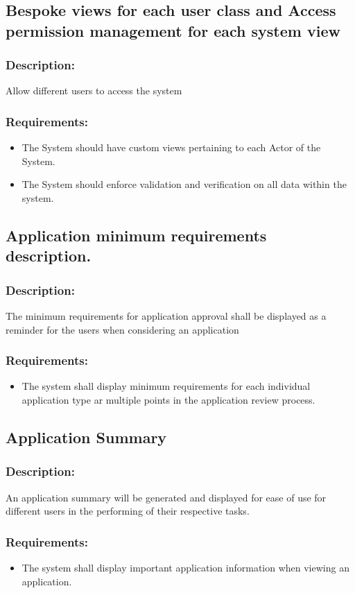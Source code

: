 \documentclass[]{article}
\begin{document}
\subsection{Bespoke views for each user class and Access permission management for each system view}
\subsubsection{ Description: }Allow different users to access the system
\subsubsection{ Requirements:} 
\begin{itemize}
\item The System should have custom views pertaining to each Actor of the System. 
\item The System should enforce validation and verification on all data within the system.
\end{itemize}
\subsection{Application minimum requirements description.}
\subsubsection{ Description: }The minimum requirements for application approval shall be displayed as a reminder for the users when considering an application
\subsubsection{ Requirements:}
\begin{itemize}
\item  The system shall display minimum requirements for each individual application type ar multiple points in the application review process.
\end{itemize}
\subsection{Application Summary}
\subsubsection{ Description: }An application summary will be generated and displayed for ease of use for different users in the performing of their respective tasks.
\subsubsection{ Requirements:}
\begin{itemize}
\item The system shall display important application information when viewing an application.

\end{itemize}
\end{document}
